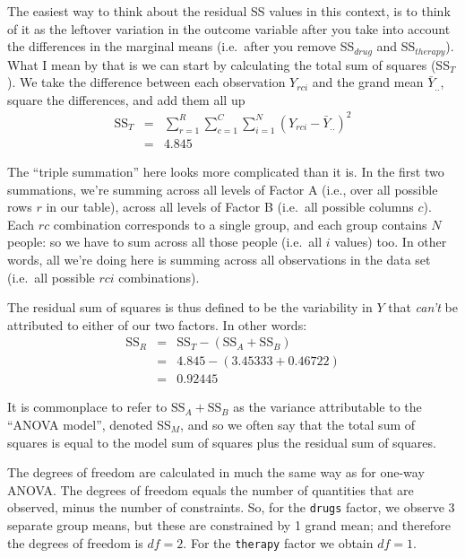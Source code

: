 \documentclass[
]{book}
\theoremstyle{definition}
\theoremstyle{definition}
\theoremstyle{definition}
\theoremstyle{definition}
\theoremstyle{remark}
\begin{document}
The easiest way to think about the residual SS values in this context, is to think of it as the leftover variation in the outcome variable after you take into account the differences in the marginal means (i.e.~after you remove SS\(_{drug}\) and SS\(_{therapy}\)). What I mean by that is we can start by calculating the total sum of squares (SS\(_T\)). We take the difference between each observation \(Y_{rci}\) and the grand mean \(\bar{Y}_{..}\), square the differences, and add them all up
\[
\begin{array}{rcl}
\mbox{SS}_T &=& \sum_{r=1}^R \sum_{c=1}^C \sum_{i=1}^N \left( Y_{rci} - \bar{Y}_{..}\right)^2
    \\
    &=& 4.845
\end{array}
\]

The ``triple summation'' here looks more complicated than it is. In the first two summations, we're summing across all levels of Factor A (i.e., over all possible rows \(r\) in our table), across all levels of Factor B (i.e.~all possible columns \(c\)). Each \(rc\) combination corresponds to a single group, and each group contains \(N\) people: so we have to sum across all those people (i.e.~all \(i\) values) too. In other words, all we're doing here is summing across all observations in the data set (i.e.~all possible \(rci\) combinations).

The residual sum of squares is thus defined to be the variability in \(Y\) that \emph{can't} be attributed to either of our two factors. In other words:
\[
\begin{array}{rcl}
\mbox{SS}_R &=& \mbox{SS}_T - (\mbox{SS}_A + \mbox{SS}_B)
    \\
    &=& 4.845 - (3.45333 + 0.46722)
    \\
    &=& 0.92445
\end{array}
\]

It is commonplace to refer to \(\mbox{SS}_A + \mbox{SS}_B\) as the variance attributable to the ``ANOVA model'', denoted SS\(_M\), and so we often say that the total sum of squares is equal to the model sum of squares plus the residual sum of squares.

The degrees of freedom are calculated in much the same way as for one-way ANOVA. The degrees of freedom equals the number of quantities that are observed, minus the number of constraints. So, for the \texttt{drugs} factor, we observe 3 separate group means, but these are constrained by 1 grand mean; and therefore the degrees of freedom is \(df = 2\). For the \texttt{therapy} factor we obtain \(df=1\).
\end{document}
